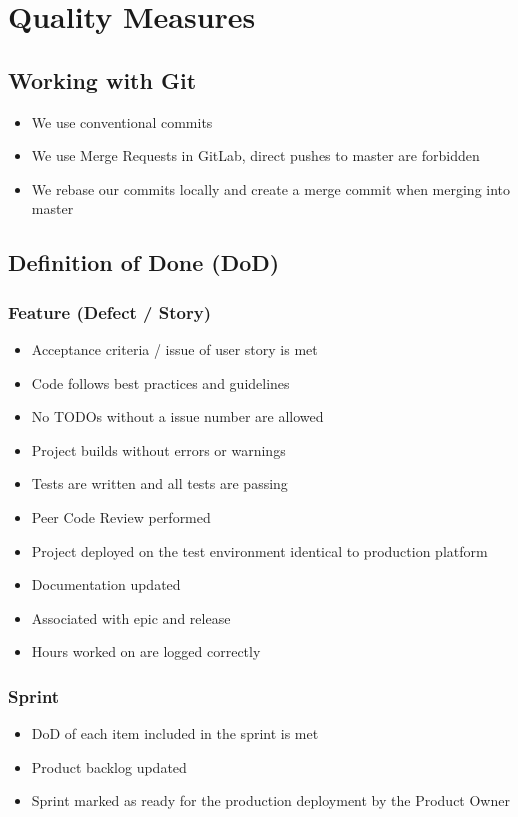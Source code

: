 \chapter{Quality Measures}

\section{Working with Git}
\begin{itemize}
    \item We use conventional commits
    \item We use Merge Requests in GitLab, direct pushes to master are forbidden
    \item We rebase our commits locally and create a merge commit when merging into master
\end{itemize}

\section{Definition of Done (DoD)}

\subsection{Feature (Defect / Story)}
\begin{itemize}
    \item Acceptance criteria / issue of user story is met 
    \item Code follows best practices and guidelines 
    \item No TODOs without a issue number are allowed 
    \item Project builds without errors or warnings 
    \item Tests are written and all tests are passing 
    \item Peer Code Review performed 
    \item Project deployed on the test environment identical to production platform 
    \item Documentation updated 
    \item Associated with epic and release 
    \item Hours worked on are logged correctly 
\end{itemize}

\subsection{Sprint}
\begin{itemize}
    \item DoD of each item included in the sprint is met 
    \item Product backlog updated 
    \item Sprint marked as ready for the production deployment by the Product Owner 
\end{itemize}

